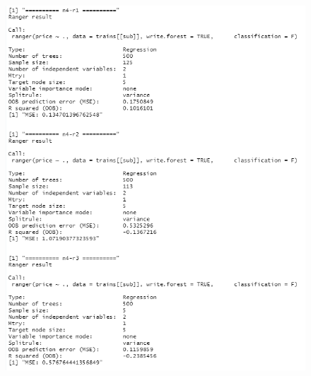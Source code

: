 \documentclass{FR16}
\begin{document}
\begin{figure}[!htb]
\begin{minipage}{0.33\textwidth}
   \end{minipage}\hfill
   \begin{minipage}{0.33\textwidth}
     \centering
     \includegraphics[width=1\linewidth]{figures/rgn2.4.png}
   \end{minipage}
   \begin{minipage}{0.33\textwidth}
     \centering

\end{minipage}
\end{figure}
\end{document}
